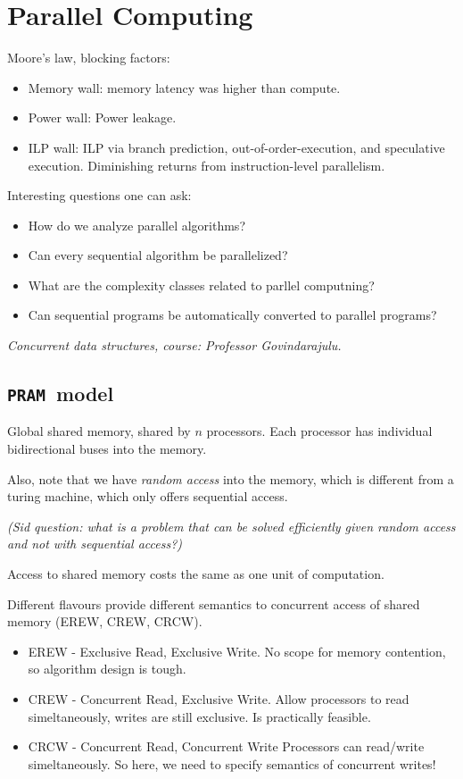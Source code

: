 \newcommand{\pram}{\texttt{PRAM}}
\chapter{Parallel Computing}

Moore's law, blocking factors:
\begin{itemize}
    \item Memory wall: memory latency was higher than compute.
    \item Power wall: Power leakage.
    \item ILP wall: ILP via branch prediction, out-of-order-execution, and
        speculative execution. Diminishing returns from instruction-level
        parallelism.
\end{itemize}

Interesting questions one can ask:
\begin{itemize}
    \item How do we analyze parallel algorithms? 
    \item Can every sequential algorithm be parallelized?
    \item What are the complexity classes related to parllel computning?
    \item Can sequential programs be automatically converted to parallel programs?
\end{itemize}

\textit{Concurrent data structures, course: Professor Govindarajulu.}

\section{\pram~model}

Global shared memory, shared by $n$ processors. Each processor has
individual bidirectional buses into the memory.

Also, note that we have \textit{random access} into the memory, which is
different from a turing machine, which only offers sequential access.

\textit{(Sid question: what is a problem that can be solved efficiently given
random access and not with sequential access?)}

Access to shared memory costs the same as one unit of computation.

Different flavours provide different semantics to concurrent access
of shared memory (EREW, CREW, CRCW).
\begin{itemize}
    \item EREW - Exclusive Read, Exclusive Write. No scope for memory contention,
        so algorithm design is tough.
    \item CREW - Concurrent Read, Exclusive Write. Allow processors to read
        simeltaneously, writes are still exclusive. Is practically feasible.
    \item CRCW - Concurrent Read, Concurrent Write
        Processors can read/write simeltaneously. So here, we need to specify
        semantics of concurrent writes!
\end{itemize}

